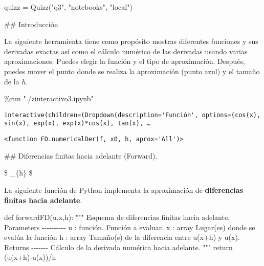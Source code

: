 \documentclass[
  letterpaper,
  DIV=11,
  numbers=noendperiod]{scrreprt}
\newenvironment{Shaded}{\begin{snugshade}}{\end{snugshade}}
\newcommand{\CommentTok}[1]{\textcolor[rgb]{0.37,0.37,0.37}{#1}}
\newcommand{\ControlFlowTok}[1]{\textcolor[rgb]{0.00,0.23,0.31}{#1}}
\newcommand{\KeywordTok}[1]{\textcolor[rgb]{0.00,0.23,0.31}{#1}}
\newcommand{\NormalTok}[1]{\textcolor[rgb]{0.00,0.23,0.31}{#1}}
\newcommand{\OperatorTok}[1]{\textcolor[rgb]{0.37,0.37,0.37}{#1}}
\newcommand{\StringTok}[1]{\textcolor[rgb]{0.13,0.47,0.30}{#1}}
\begin{document}
\begin{Shaded}
\begin{Highlighting}[]
\NormalTok{quizz }\OperatorTok{=}\NormalTok{ Quizz(}\StringTok{"q3"}\NormalTok{, }\StringTok{"notebooks"}\NormalTok{, }\StringTok{"local"}\NormalTok{)}
\end{Highlighting}
\end{Shaded}

\#\# Introducción

La siguiente herramienta tiene como propósito mostras diferentes
funciones y sus derivadas exactas así como el cálculo numérico de las
derivadas usando varias aproximaciones. Puedes elegir la función y el
tipo de aproximación. Después, puedes mover el punto donde se realiza la
aproximación (punto azul) y el tamaño de la \(h\).

\begin{Shaded}
\begin{Highlighting}[]
\OperatorTok{\%}\NormalTok{run }\StringTok{"./zinteractivo3.ipynb"}
\end{Highlighting}
\end{Shaded}

\begin{verbatim}
interactive(children=(Dropdown(description='Función', options=(cos(x), sin(x), exp(x), exp(x)*cos(x), tan(x), …
\end{verbatim}

\begin{verbatim}
<function FD.numericalDer(f, x0, h, aprox='All')>
\end{verbatim}

\#\# Diferencias finitas hacia adelante (Forward).

\$ \displaystyle {}
\approx \lim\limits\_\{h\}  \$

La siguiente función de Python implementa la aproximación de
\textbf{diferencias finitas hacia adelante}.

\begin{Shaded}
\begin{Highlighting}[]
\KeywordTok{def}\NormalTok{ forwardFD(u,x,h):}
    \CommentTok{""" }
\CommentTok{    Esquema de diferencias finitas hacia adelante.}
\CommentTok{    }
\CommentTok{    Parameters}
\CommentTok{    {-}{-}{-}{-}{-}{-}{-}{-}{-}{-}}
\CommentTok{    u : función. }
\CommentTok{    Función a evaluar.}
\CommentTok{    }
\CommentTok{    x : array}
\CommentTok{    Lugar(es) donde se evalúa la función}
\CommentTok{    }
\CommentTok{    h : array}
\CommentTok{    Tamaño(s) de la diferencia entre u(x+h) y u(x).}
\CommentTok{    }
\CommentTok{    Returns}
\CommentTok{    {-}{-}{-}{-}{-}{-}{-}}
\CommentTok{    Cálculo de la derivada numérica hacia adelante.}
\CommentTok{    """}
    \ControlFlowTok{return}\NormalTok{ (u(x}\OperatorTok{+}\NormalTok{h)}\OperatorTok{{-}}\NormalTok{u(x))}\OperatorTok{/}\NormalTok{h}
\end{Highlighting}
\end{Shaded}
\end{document}
